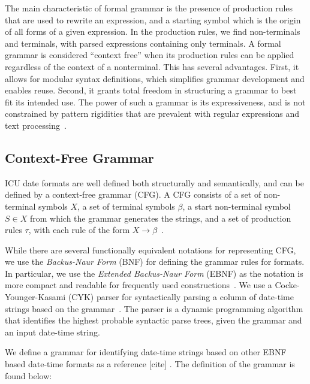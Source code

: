 The main characteristic of formal grammar is the presence of production rules that are used to rewrite an expression, and a starting symbol which is the origin of all forms of a given expression. In the production rules, we find non-terminals and terminals, with parsed expressions containing only terminals. A formal grammar is considered ``context free'' when its production rules can be applied regardless of the context of a nonterminal. This has several advantages. First, it allows for modular syntax definitions, which simplifies grammar development and enables reuse. Second, it grants total freedom
in structuring a grammar to best fit its intended use. The power of such a grammar is its expressiveness, and is not constrained by pattern rigidities that are prevalent with regular expressions and text processing~\cite{Grune:1990}.


\subsection{Context-Free Grammar}
ICU date formats are well defined both structurally and semantically, and can be defined by a context-free grammar (CFG). A CFG consists of a set of non-terminal symbols $X$, a set of terminal symbols $\beta$, a start non-terminal symbol $S \in X$ from which the grammar generates the strings, and a set of production rules $\tau$, with each rule of the form $X \rightarrow \beta$~\cite{Hopcroft:1990}. 

While there are several functionally equivalent notations for representing CFG, we use the \textit{Backus-Naur Form} (BNF) for defining the grammar rules for \dateparse formats. In particular, we use the \textit{Extended Backus-Naur Form} (EBNF) as the notation is more compact and readable for frequently used constructions~\cite{Grune:1990}. We use a Cocke-Younger-Kasami (CYK) parser for syntactically parsing a column of date-time strings based on the grammar~\cite{Cocke:1969,Younger67,Kasami:1965}. The parser is a dynamic programming algorithm that identifies the highest probable syntactic parse trees, given the grammar and an input date-time string.


We define a grammar for identifying date-time strings based on other EBNF based date-time formats as a reference  [cite] . The definition of the grammar is found below:

